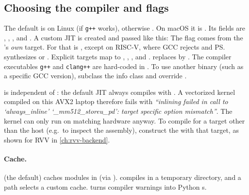 \subsection{Choosing the compiler and flags}
The default  is  on Linux (if \texttt{g++} works),
otherwise . On macOS it is . Its fields are
, , ,
 and . A custom JIT is created
and passed like this:
The  flag comes from the 's \emph{own} target. For
 that is , except on RISC-V, where GCC rejects
 and \ps{} synthesizes  or
. Explicit targets map to ,
, ,  and
.  replaces  by
. The compiler executables \texttt{g++} and
\texttt{clang++} are hard-coded in . To use another binary (such as a
specific GCC version), subclass the info class and override .

\begin{pitfall}
   is independent of : the
  default JIT always compiles with . A vectorized
   kernel compiled on this AVX2 laptop therefore fails with
  \emph{``inlining failed in call to `always\_inline' `\_mm512\_storeu\_pd': target
  specific option mismatch''}. The kernel can only run on matching hardware anyway. To
  compile for a target other than the host (e.g.\ to inspect the assembly), construct
  the  with that target, as shown for RVV in \cref{ch:rvv-backend}.
\end{pitfall}

\paragraph{Cache.}
 (the default) caches modules in
 (via ).  compiles in
a temporary directory, and a path selects a custom cache. 
turns compiler warnings into Python s.

